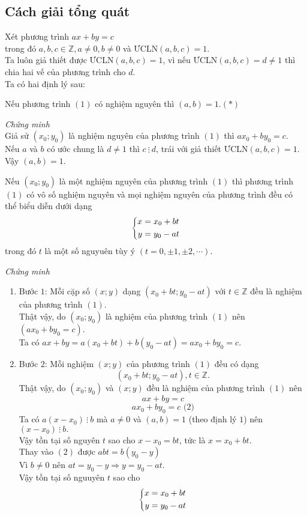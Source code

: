 \subsection{Cách giải tổng quát}
Xét phương trình $ax + by =c$\\
trong đó $a,b,c \in \mathbb{Z}, a \neq 0, b \neq 0$ và ƯCLN$(a,b,c) = 1.$\\
Ta luôn giả thiết được ƯCLN$(a,b,c) =1$, vì nếu ƯCLN$(a,b,c) = d \neq 1$ thì chia hai vế của phương trình cho $d$.\\
Ta có hai định lý sau:
\begin{dl}
Nếu phương trình $(1)$ có nghiệm nguyên thì $(a,b) =1$.\hfill$(*)$
\end{dl}
\textit{Chứng minh}\\
Giả sử $(x_0; y_0)$ là nghiệm nguyên của phương trình $(1)$ thì $ax_0 + by_0 = c.$\\
Nếu $a$ và $b$ có ước chung là $d \neq 1$ thì $c ~\vdots~ d$, trái với giả thiết ƯCLN$(a,b,c) =1$.\\
Vậy $(a,b) =1.$
\begin{dl}
Nếu $(x_0 ; y_0)$ là một nghiệm nguyên của phương trình $(1)$ thì phương trình $(1)$ có vô số nghiệm nguyên và mọi nghiệm nguyên của phương trình đều có thể biểu diễn dưới dạng
$$\left\{\begin{aligned}x &= x_0 + bt \\ y &= y_0 - at\end{aligned}\right.$$
trong đó $t$ là một số nguyuên tùy ý $\left(t=0,\pm 1, \pm 2, \cdots \right).$
\end{dl}
\textit{Chứng minh}
\begin{enumerate}
\item Bước $1$: Mỗi cặp số $\left( x;y \right)$ dạng $\left( x_0 + bt ; y_0 - at \right)$ với $t \in \mathbb{Z}$ đều là nghiệm của phương trình $(1)$.\\
Thật vậy, do $\left( x_0 ; y_0\right)$ là nghiệm của phương trình $(1)$ nên $\left( ax_0 + by_0 = c \right).$\\
Ta có $ax + by = a (x_0 + bt) + b (y_0 - at) = ax_0 + by_0 =c.$
\item Bước $2$: Mỗi nghiệm $(x;y)$ của phương trình $(1)$ đều có dạng
$$(x_0 + bt ; y_0 -at), t \in \mathbb{Z}.$$
Thật vậy, do $(x_0 ; y_0)$ và $(x;y)$ đều là nghiệm của phương trình $(1)$ nên
$$ax + by = c$$
$$ax_0 + by_0 = c \text{ (2)}$$
Ta có $a(x - x_0) ~\vdots~ b$ mà $a \neq 0$ và $(a,b) =1$ (theo định lý $1$) nên $(x - x_0) ~\vdots~ b.$\\
Vậy tồn tại số nguyên $t$ sao cho $x - x_0 = bt$, tức là $x = x_0 + bt.$\\
Thay vào $(2)$ được $abt = b(y_0 -y)$\\
Vì $b \neq 0$ nên $at = y_0 - y \Rightarrow y = y_0 - at.$\\
Vậy tồn tại số nguuyên $t$ sao cho 
$$\left\{\begin{aligned}x &= x_0 + bt \\ y &= y_0 - at\end{aligned}\right.$$
\end{enumerate}
